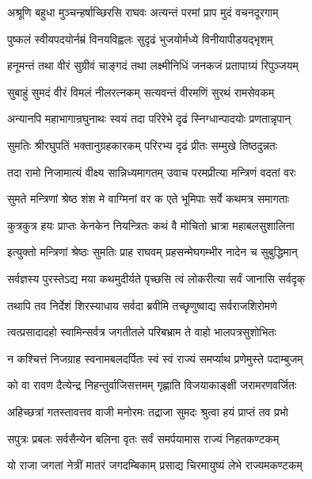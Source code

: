 \twolineshloka
{अश्रूणि बहुधा मुञ्चन्हर्षाच्छिरसि राघवः}
{अत्यन्तं परमां प्राप मुदं वचनदूरगाम्}%

\twolineshloka
{पुष्कलं स्वीयपदयोर्नम्रं विनयविह्वलः}
{सुदृढं भुजयोर्मध्ये विनीयापीडयद्भृशम्}%

\twolineshloka
{हनूमन्तं तथा वीरं सुग्रीवं चाङ्गदं तथा}
{लक्ष्मीनिधिं जनकजं प्रतापाग्र्यं रिपुञ्जयम्}%

\twolineshloka
{सुबाहुं सुमदं वीरं विमलं नीलरत्नकम्}
{सत्यवन्तं वीरमणिं सुरथं रामसेवकम्}%

\twolineshloka
{अन्यानपि महाभागान्रघुनाथः स्वयं तदा}
{परिरेभे दृढं स्निग्धान्पादयोः प्रणतान्नृपान्}%

\twolineshloka
{सुमतिः श्रीरघुपतिं भक्तानुग्रहकारकम्}
{परिरभ्य दृढं प्रीतः सम्मुखे तिष्ठदुन्नतः}%

\twolineshloka
{तदा रामो निजामात्यं वीक्ष्य सान्निध्यमागतम्}
{उवाच परमप्रीत्या मन्त्रिणं वदतां वरः}%

\twolineshloka
{सुमते मन्त्रिणां श्रेष्ठ शंश मे वाग्मिनां वर}
{क एते भूमिपाः सर्वे कथमत्र समागताः}%

\twolineshloka
{कुत्रकुत्र हयः प्राप्तः केनकेन नियन्त्रितः}
{कथं वै मोचितो भ्रात्रा महाबलसुशालिना}%


\twolineshloka
{इत्युक्तो मन्त्रिणां श्रेष्ठः सुमतिः प्राह राघवम्}
{प्रहसन्मेघगम्भीर नादेन च सुबुद्धिमान्}%


\twolineshloka
{सर्वज्ञस्य पुरस्तेऽद्य मया कथमुदीर्यते}
{पृच्छसि त्वं लोकरीत्या सर्वं जानासि सर्वदृक्}%

\twolineshloka
{तथापि तव निर्देशं शिरस्याधाय सर्वदा}
{ब्रवीमि तच्छृणुष्वाद्य सर्वराजशिरोमणे}%

\twolineshloka
{त्वत्प्रसादादहो स्वामिन्सर्वत्र जगतीतले}
{परिबभ्राम ते वाहो भालपत्रसुशोभितः}%

\twolineshloka
{न कश्चित्तं निजग्राह स्वनामबलदर्पितः}
{स्वं स्वं राज्यं समर्प्याथ प्रणेमुस्ते पदाम्बुजम्}%

\twolineshloka
{को वा रावण दैत्येन्द्र निहन्तुर्वाजिसत्तमम्}
{गृह्णाति विजयाकाङ्क्षी जरामरणवर्जितः}%

\twolineshloka
{अहिच्छत्रां गतस्तावत्तव वाजी मनोरमः}
{तद्राजा सुमदः श्रुत्वा हयं प्राप्तं तव प्रभो}%

\twolineshloka
{सपुत्रः प्रबलः सर्वसैन्येन बलिना वृतः}
{सर्वं समर्पयामास राज्यं निहतकण्टकम्}%

\twolineshloka
{यो राजा जगतां नेत्रीं मातरं जगदम्बिकाम्}
{प्रसाद्य चिरमायुष्यं लेभे राज्यमकण्टकम्}%

